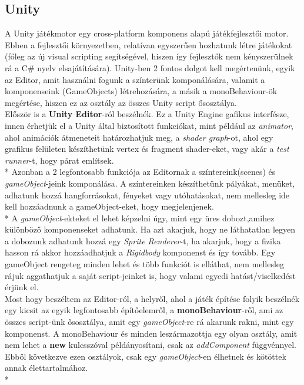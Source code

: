 \subsection{Unity}
A Unity játékmotor egy cross-platform komponens alapú játékfejlesztői motor. Ebben a fejlesztői környezetben, relatívan egyszerűen hozhatunk létre játékokat (főleg az új visual scripting segítségével, hiszen így fejlesztők nem kényszerülnek rá a C\# nyelv elsajátítására). Unity-ben 2 fontos dolgot kell megértenünk, egyik az Editor, amit használni fogunk a színterünk komponálására, valamit a komponenseink (GameObjects) létrehozására, a másik a monoBehaviour-ök megértése, hiszen ez az osztály az összes Unity script ősosztálya.\\
Először is a \textbf{Unity Editor}-ról beszélnék. Ez a Unity Engine gafikus interfésze, innen érhetjük el a Unity által biztosított funkciókat, mint például az \textit{animator}, ahol animációk átmeneteit határozhatjuk meg, a \textit{shader graph}-ot, ahol egy grafikus felületen készíthetünk vertex és fragment shader-eket, vagy akár a \textit{test runner}-t, hogy párat említsek.\\*
Azonban a 2 legfontosabb funkciója az Editornak a színtereink(scenes) és \textit{gameObject}-jeink komponálása. A színtereinken készíthetünk pályákat, menüket, adhatunk hozzá hangforrásokat, fényeket vagy utóhatásokat, nem mellesleg ide kell hozzáadnunk a gameObject-eket, hogy megjelenjenek.\\*
A \textit{gameObject}-ekteket el lehet képzelni úgy, mint egy üres dobozt,amihez különböző komponenseket adhatunk. Ha azt akarjuk, hogy ne láthatatlan legyen a dobozunk adhatunk hozzá egy \textit{Sprite Renderer}-t, ha akarjuk, hogy a fizika hasson rá akkor hozzáadhatjuk a \textit{Rigidbody} komponenst és így tovább. Egy gameObject rengeteg minden lehet és több funkciót is elláthat, nem mellesleg rájuk aggathatjuk a saját script-jeinket is, hogy valami egyedi hatást/viselkedést érjünk el.\\
Most hogy beszéltem az Editor-ról, a helyről, ahol a játék építése folyik beszélnék egy kicsit az egyik legfontosabb építőelemről, a \textbf{monoBehaviour}-ről, ami az összes script-ünk ősosztálya, amit egy \textit{gameObject}-re rá akarunk rakni, mint egy komponenst. A monoBehaviour és minden leszármazottja egy olyan osztály, amit nem lehet a \textbf{new} kulcsszóval példányosítani, csak az \textit{addComponent} függvénnyel. Ebből következve ezen osztályok, csak egy \textit{gameObject}-en élhetnek és kötöttek annak élettartalmához.\\*
